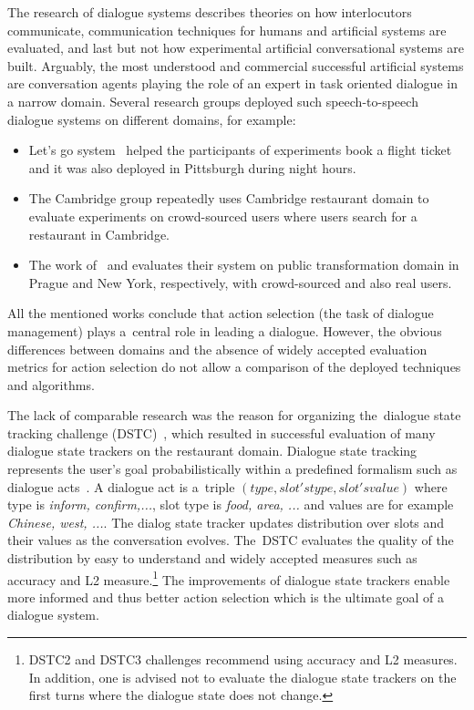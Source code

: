 \documentclass[11pt]{article}
\begin{document}
The research of dialogue systems describes theories on how interlocutors communicate, communication techniques for humans and artificial systems are evaluated, and last but not how experimental artificial conversational systems are built.
Arguably, the most understood and commercial successful artificial systems are conversation agents playing the role of an expert in task oriented dialogue in a narrow domain.
Several research groups deployed such speech-to-speech dialogue systems on different domains, for example:
\begin{itemize}
    \item Let's go system~\cite{raux_lets_2005} helped the participants of experiments book a flight ticket and it was also deployed in Pittsburgh during night hours.
    \item The Cambridge group repeatedly uses Cambridge restaurant domain to evaluate experiments on crowd-sourced users where users search for a restaurant in Cambridge.
    \item The work of~\cite{dusek_sequence2sequence_2016} and \cite{vejman_martin_development_2015} evaluates their system on public transformation domain in Prague and New York, respectively, with crowd-sourced and also real users. 
\end{itemize}
All the mentioned works conclude that action selection (the task of dialogue management) plays a~central role in leading a dialogue.
However, the obvious differences between domains and the absence of widely accepted evaluation metrics for action selection do not allow a comparison of the deployed techniques and algorithms.

The lack of comparable research was the reason for organizing the~dialogue state tracking challenge (DSTC)~\cite{dstcwilliams}, which resulted in successful evaluation of many dialogue state trackers on the restaurant domain.
Dialogue state tracking represents the user's goal probabilistically within a predefined formalism such as dialogue acts~\cite{dstcwilliams,henderson2014second,hendersonthird}.
A dialogue act is a~triple $(type, slot's type, slot's value)$ where type is {\it inform, confirm,...}, slot type is {\it food, area, ...} and values are for example {\it Chinese, west, ...}.
The dialog state tracker updates distribution over slots and their values as the conversation evolves.
The~DSTC evaluates the quality of the distribution by easy to understand and widely accepted measures such as accuracy and L2 measure.\footnote{DSTC2 and DSTC3 challenges recommend using accuracy and L2 measures. In addition, one is advised not to evaluate the dialogue state trackers on the first turns where the dialogue state does not change.}
The improvements of dialogue state trackers enable more informed and thus better action selection which is the ultimate goal of a dialogue system.
\end{document}

